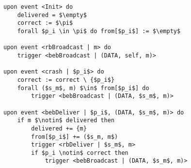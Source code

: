 \begin{lstlisting}[mathescape, caption= Lazy reliable broadcast, captionpos=b]
upon event <Init> do
    delivered = $\empty$
    correct := $\pi$
    forall $p_i \in \pi$ do from[$p_i$] := $\empty$

upon event <rbBroadcast | m> do
    trigger <bebBroadcast | (DATA, self, m)>

upon event <crash | $p_i$> do
    correct := correct \ {$p_i$}
    forall ($s_m$, m) $\in$ from[$p_i$] do
        trigger <bebBroadcast | (DATA, $s_m$, m)>

upon event <bebDeliver | $p_i$, (DATA, $s_m$, m)> do
    if m $\notin$ delivered then
        delivered += {m}
        from[$p_i$] += ($s_m, m$)
        trigger <rbDeliver | $s_m$, m>
        if $p_i \notin$ correct then
            trigger <bebBroadcast | (DATA, $s_m$, m)>
\end{lstlisting}
